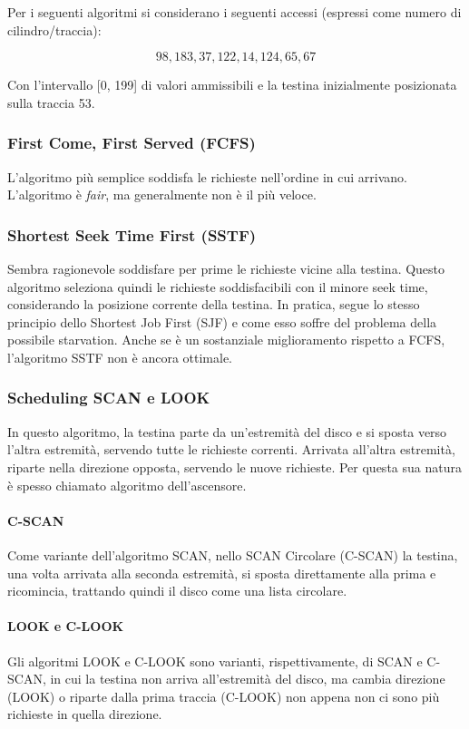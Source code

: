 \documentclass[a4paper]{article}
\begin{document}
Per i seguenti algoritmi si considerano i seguenti accessi (espressi come numero di cilindro/traccia):

$$98, 183, 37, 122, 14, 124, 65, 67$$

Con l'intervallo [0, 199] di valori ammissibili e la testina inizialmente posizionata sulla traccia 53.

\subsubsection{First Come, First Served (FCFS)}
L'algoritmo più semplice soddisfa le richieste nell'ordine in cui arrivano. L'algoritmo è \textit{fair}, ma generalmente non è il più veloce.

\subsubsection{Shortest Seek Time First (SSTF)}
Sembra ragionevole soddisfare per prime le richieste vicine alla testina. Questo algoritmo seleziona quindi le richieste soddisfacibili con il minore seek time, considerando la posizione corrente della testina. In pratica, segue lo stesso principio dello Shortest Job First (SJF) e come esso soffre del problema della possibile starvation. Anche se è un sostanziale miglioramento rispetto a FCFS, l'algoritmo SSTF non è ancora ottimale.

\subsubsection{Scheduling SCAN e LOOK}
In questo algoritmo, la testina parte da un'estremità del disco e si sposta verso l'altra estremità, servendo tutte le richieste correnti. Arrivata all'altra estremità, riparte nella direzione opposta, servendo le nuove richieste. Per questa sua natura è spesso chiamato algoritmo dell'ascensore.

\paragraph{C-SCAN} Come variante dell'algoritmo SCAN, nello SCAN Circolare (C-SCAN) la testina, una volta arrivata alla seconda estremità, si sposta direttamente alla prima e ricomincia, trattando quindi il disco come una lista circolare.

\paragraph{LOOK e C-LOOK} Gli algoritmi LOOK e C-LOOK sono varianti, rispettivamente, di SCAN e C-SCAN, in cui la testina non arriva all'estremità del disco, ma cambia direzione (LOOK) o riparte dalla prima traccia (C-LOOK) non appena non ci sono più richieste in quella direzione.
\end{document}
